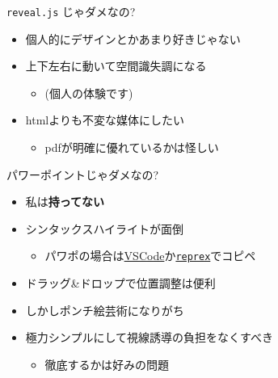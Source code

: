 \documentclass[14pt,ignorenonframetext,]{beamer}
\providecommand{\tightlist}{%
  \setlength{\itemsep}{0pt}\setlength{\parskip}{0pt}}
\begin{document}
\begin{frame}{\texttt{reveal.js} じゃダメなの?}
\protect\hypertarget{reveal.js-ux3058ux3083ux30c0ux30e1ux306aux306e}{}

\begin{itemize}
\tightlist
\item
  個人的にデザインとかあまり好きじゃない
\item
  上下左右に動いて空間識失調になる

  \begin{itemize}
  \tightlist
  \item
    (個人の体験です)
  \end{itemize}
\item
  htmlよりも不変な媒体にしたい

  \begin{itemize}
  \tightlist
  \item
    pdfが明確に優れているかは怪しい
  \end{itemize}
\end{itemize}

\end{frame}

\begin{frame}[fragile]{パワーポイントじゃダメなの?}
\protect\hypertarget{ux30d1ux30efux30fcux30ddux30a4ux30f3ux30c8ux3058ux3083ux30c0ux30e1ux306aux306e}{}

\begin{itemize}
\tightlist
\item
  私は\textbf{持ってない}
\item
  シンタックスハイライトが面倒

  \begin{itemize}
  \tightlist
  \item
    パワポの場合は\href{https://notchained.hatenablog.com/entry/2017/02/20/221446}{VSCode}か\href{https://reprex.tidyverse.org/articles/articles/rtf.html}{\texttt{reprex}}でコピペ
  \end{itemize}
\item
  ドラッグ\&ドロップで位置調整は便利
\item
  しかしポンチ絵芸術になりがち
\item
  極力シンプルにして視線誘導の負担をなくすべき

  \begin{itemize}
  \tightlist
  \item
    徹底するかは好みの問題
  \end{itemize}
\end{itemize}

\end{frame}
\end{document}
